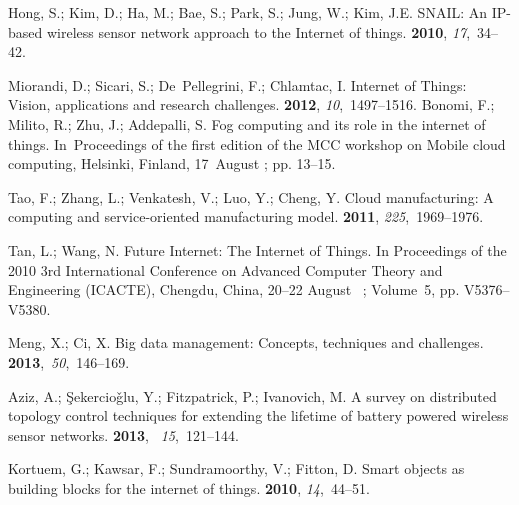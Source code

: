 \documentclass[symmetry,article,accept,moreauthors,pdftex10pt,a4paper]{mdpi}
\begin{document}
\begin{thebibliography}{999}
Hong, S.; Kim, D.; Ha, M.; Bae, S.; Park, S.; Jung, W.; Kim, J.E.
\newblock SNAIL: An IP-based wireless sensor network approach to the Internet
of things.
 {\bf 2010}, {\em 17},~34--42.

Miorandi, D.; Sicari, S.; De~Pellegrini, F.; Chlamtac, I.
\newblock Internet of Things: Vision, applications and research challenges.
 {\bf 2012}, {\em 10},~1497--1516.
Bonomi, F.; Milito, R.; Zhu, J.; Addepalli, S.
\newblock Fog computing and its role in the internet of things. In~Proceedings of the first edition of the MCC workshop on Mobile cloud computing, Helsinki, Finland, 17~August
; pp. 13--15.

Tao, F.; Zhang, L.; Venkatesh, V.; Luo, Y.; Cheng, Y.
\newblock Cloud manufacturing: A computing and service-oriented manufacturing
model.
 {\bf 2011}, {\em 225},~1969--1976.

Tan, L.; Wang, N.
\newblock Future Internet: The Internet of Things. In Proceedings of the 2010 3rd International Conference on Advanced Computer Theory and Engineering (ICACTE), Chengdu, China, 20--22 August~
; Volume~5, pp. V5376--V5380.

Meng, X.; Ci, X.
\newblock Big data management: Concepts, techniques and challenges.
{\bf 2013},~{\em 50},~146--169.

Aziz, A.; Şekercioǧlu, Y.; Fitzpatrick, P.; Ivanovich, M.
\newblock A survey on distributed topology control techniques for extending the
lifetime of battery powered wireless sensor networks.
 {\bf 2013},~{\em
	15},~121--144.

Kortuem, G.; Kawsar, F.; Sundramoorthy, V.; Fitton, D.
\newblock Smart objects as building blocks for the internet of things.
 {\bf 2010}, {\em 14},~44--51.


\end{thebibliography}
\end{document}
